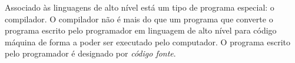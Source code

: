Associado às linguagens de alto nível está um tipo de programa especial: o compilador. O compilador não é mais do que um programa que converte o programa escrito pelo programador em linguagem de alto nível para código máquina de forma a poder ser executado pelo computador. O programa escrito pelo programador é designado por \emph{código fonte}.

%
%
%
%
%
%
%
